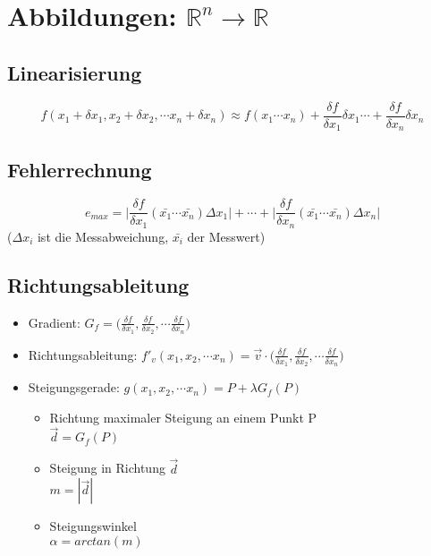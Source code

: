 \section{Abbildungen: $\mathbb{R}^n \rightarrow \mathbb{R}$}

\subsection{Linearisierung}
\begin{equation*}
	f(x_1 + \delta x_1, x_2 + \delta x_2, \cdots x_n + \delta x_n) \approx f(x_1 \cdots x_n) + \frac{\delta f}{\delta x_1} \delta x_1 \cdots + \frac{\delta f}{\delta x_n} \delta x_n
\end{equation*}

\subsection{Fehlerrechnung}
\begin{equation*}
	e_{max} = \bigg | \frac{\delta f}{\delta x_1}(\bar{x_1} \cdots \bar{x_n}) \Delta x_1 \bigg | + \cdots + \bigg | \frac{\delta f}{\delta x_n}(\bar{x_1} \cdots \bar{x_n}) \Delta x_n \bigg |
\end{equation*}
($\Delta x_i$ ist die Messabweichung, $\bar{x_i}$ der Messwert)

\subsection{Richtungsableitung}
\begin{itemize}
	\item Gradient:
		$G_f = \big(\frac{\delta f}{\delta x_1}, \frac{\delta f}{\delta x_2}, \cdots \frac{\delta f}{\delta x_n}\big )$
	\item Richtungsableitung:
		$f'_v(x_1, x_2, \cdots x_n) = \vec{v} \cdot \big(\frac{\delta f}{\delta x_1}, \frac{\delta f}{\delta x_2}, \cdots \frac{\delta f}{\delta x_n}\big )$
	\item Steigungsgerade:
		$g(x_1, x_2, \cdots x_n) = P + \lambda G_f(P)$

		\begin{itemize}
			\item Richtung maximaler Steigung an einem Punkt P \\
			$\vec{d} = G_f(P)$
			\item Steigung in Richtung $\vec{d}$ \\ $m = |\vec{d}|$
			\item Steigungswinkel \\ $\alpha = arctan(m)$
		\end{itemize}
\end{itemize}

